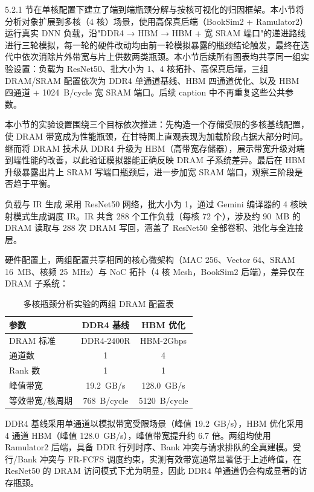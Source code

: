 5.2.1 节在单核配置下建立了端到端瓶颈分解与按核可视化的归因框架。本小节将分析对象扩展到多核（4 核）场景，使用高保真后端（BookSim2 + Ramulator2）运行真实 DNN 负载，沿"DDR4 → HBM → HBM + 宽 SRAM 端口"的递进路线进行三轮模拟，每一轮的硬件改动均由前一轮模拟暴露的瓶颈结论触发，最终在迭代中依次消除片外带宽与片上供数两类瓶颈。本小节后续所有图表均共享同一组实验设置：负载为 ResNet50、批大小为 1、4 核拓扑、高保真后端，三组 DRAM/SRAM 配置依次为 DDR4 单通道基线、HBM 四通道优化、以及 HBM 四通道 + \SI{1024}{B/cycle} 宽 SRAM 端口。后续 caption 中不再重复这些公共参数。

本小节的实验设置围绕三个目标依次推进：先构造一个存储受限的多核基线配置，使 DRAM 带宽成为性能瓶颈，在甘特图上直观表现为加载阶段占据大部分时间。继而将 DRAM 技术从 DDR4 升级为 HBM（高带宽存储器），展示带宽升级对端到端性能的改善，以此验证模拟器能正确反映 DRAM 子系统差异。最后在 HBM 升级暴露出片上 SRAM 写端口瓶颈后，进一步加宽 SRAM 端口，观察三阶段是否趋于平衡。

负载与 IR 生成  采用 ResNet50 网络，批大小为 1，通过 Gemini 编译器的 4 核映射模式生成调度 IR。IR 共含 288 个工作负载（每核 72 个），涉及约 \SI{90}{MB} 的 DRAM 读取与 288 次 DRAM 写回，涵盖了 ResNet50 全部卷积、池化与全连接层。

硬件配置上，两组配置共享相同的核心微架构（MAC 256、Vector 64、SRAM \SI{16}{MB}、核频 \SI{25}{MHz}）与 NoC 拓扑（4 核 Mesh，BookSim2 后端），差异仅在 DRAM 子系统：

\begin{table}[H]
  \centering
  \caption{多核瓶颈分析实验的两组 DRAM 配置表}
  \label{tab:c5_dram_configs}
  \small
  \begin{tabular*}{\textwidth}{@{\extracolsep{\fill}}lcc}
    \toprule
    参数 & DDR4 基线 & HBM 优化 \\
    \midrule
    DRAM 标准      & DDR4-2400R  & HBM-2Gbps \\
    通道数         & 1           & 4 \\
    Rank 数        & 1           & 1 \\
    峰值带宽       & \SI{19.2}{GB/s}  & \SI{128.0}{GB/s} \\
    等效带宽/核周期 & \SI{768}{B/cycle} & \SI{5120}{B/cycle} \\
    \bottomrule
  \end{tabular*}
\end{table}

DDR4 基线采用单通道以模拟带宽受限场景（峰值 \SI{19.2}{GB/s}），HBM 优化采用 4 通道 HBM（峰值 \SI{128.0}{GB/s}），峰值带宽提升约 6.7 倍。两组均使用 Ramulator2 后端，具备 DDR 行列时序、Bank 冲突与请求排队的全真建模。受行/Bank 冲突与 FR-FCFS 调度约束，实测有效带宽通常显著低于上述峰值，在 ResNet50 的 DRAM 访问模式下尤为明显，因此 DDR4 单通道仍会构成显著的访存瓶颈。

